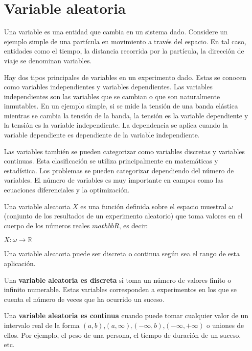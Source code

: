 \section{Variable aleatoria}

Una variable es una entidad que cambia en un sistema dado. Considere un ejemplo
simple de una partícula en movimiento a través del espacio. En tal caso,
entidades como el tiempo, la distancia recorrida por la partícula, la dirección
de viaje se denominan variables.

Hay dos tipos principales de variables en un experimento dado. Estas se conocen
como variables independientes y variables dependientes. Las variables
independientes son las variables que se cambian o que son naturalmente
inmutables. En un ejemplo simple, si se mide la tensión de una banda elástica
mientras se cambia la tensión de la banda, la tensión es la variable dependiente
y la tensión es la variable independiente. La dependencia se aplica cuando la
variable dependiente es dependiente de la variable independiente.

Las variables también se pueden categorizar como variables discretas y variables
continuas. Esta clasificación se utiliza principalmente en matemáticas y
estadística. Los problemas se pueden categorizar dependiendo del número de
variables. El número de variables es muy importante en campos como las
ecuaciones diferenciales y la optimización.

Una variable aleatoria $X$ es una función definida sobre el espacio muestral
$\omega$ (conjunto de los resultados de un experimento aleatorio) que toma
valores en el cuerpo de los números reales $mathbb{R}$, es decir:


$ X : \omega \rightarrow \mathbb{R} $


Una variable aleatoria puede ser discreta o continua según sea el rango de esta
aplicación.


Una \textbf{variable aleatoria es discreta} si toma un número de valores finito
o infinito numerable. Estas variables corresponden a experimentos en los que se
cuenta el número de veces que ha ocurrido un suceso.


Una \textbf{variable aleatoria es continua} cuando puede tomar cualquier valor
de un intervalo real de la forma $(a, b)$,$(a,\infty)$,$(-\infty, b)$,$(-\infty,
+\infty)$ o uniones de ellos. Por ejemplo, el peso de una persona, el tiempo de
duración de un suceso, etc.

